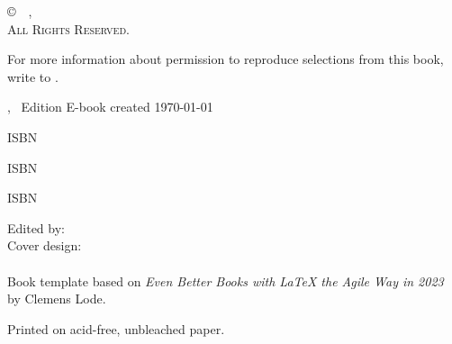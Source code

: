 \thispagestyle{empty}
\begin{center}

\copyright~\the\year~\textit{\mypublishingcompany}, \mypublishingcompanylocation\\
\textsc{All Rights Reserved.}\\
\mypublishingcompanyurl{}

For more information about permission to reproduce selections from this book, write to \mypublishingcompanyemail.

\ifxetex
	\the\year, \editionNumber~Edition
\else
	E-book created \today
\fi

\ifxetex
\ifhardcover
\textsc{ISBN} \hardcoverISBN\par
\else
\textsc{ISBN} \softcoverISBN\par
\fi
\else
\textsc{ISBN} \ebookISBN\par
\fi


Edited by: \textit{\editorName}\\
Cover design: \textit{\designerName}\\

~\\
Book template based on \textit{Even Better Books with LaTeX the Agile Way in 2023} by Clemens Lode.

\ifxetex
	Printed on acid\hyp{}free, unbleached paper.
\fi
~\\	


	
\end{center}



